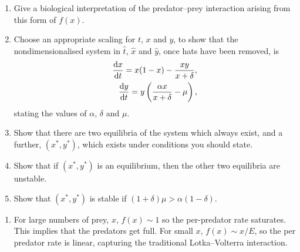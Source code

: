 \documentclass[a4paper, 12pt]{article}
\begin{document}
\begin{enumerate}[label={\bf \arabic{*}.\;}, ref={\arabic{*}},itemsep=3ex, left=0ex]
{      \begin{enumerate}[label=(\alph*)]
        \item Give a biological interpretation of the predator--prey interaction arising from this form of $f(x)$.
        \item Choose an appropriate scaling for $t$, $x$ and $y$, to show that the nondimensionalised system in $\hat{t}$, $\hat{x}$ and $\hat{y}$, once hats have been removed, is
          \begin{align*}
            \fd{x}{t} = x(1-x) - \frac{xy}{x+\delta},\\
            \fd{y}{t} = y\left( \frac{\alpha x}{x+\delta} - \mu \right),
          \end{align*}
          stating the values of $\alpha$, $\delta$ and $\mu$.
        \item Show that there are two equilibria of the system which always exist, and a further, $(x^*, y^*)$, which exists under conditions you should state. %
        \item Show that if $(x^*, y^*)$ is an equilibrium, then the other two equilibria are unstable.
        \item Show that $(x^*, y^*)$ is stable if $(1+\delta)\mu > \alpha(1-\delta)$.
      \end{enumerate}
    }
    {
      \begin{enumerate}[label=(\alph*)]
        \item %
          For large numbers of prey, $x$, $f(x) \sim 1$ so the per-predator rate saturates. This implies that the predators get full. For small $x$, $f(x) \sim x/E$, so the per predator rate is linear, capturing the traditional Lotka--Volterra interaction.


\end{enumerate}}
\end{enumerate}
\end{document}

